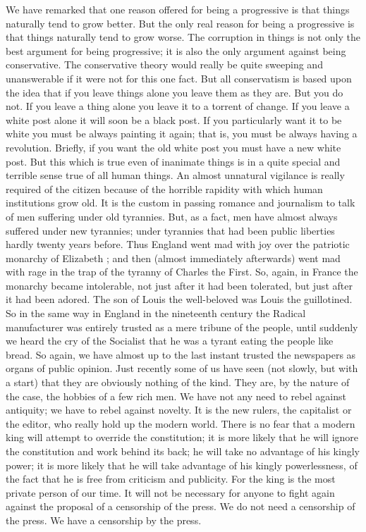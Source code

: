 \documentclass{book}
\begin{document}
We have remarked that one reason offered for being a progressive is that things naturally tend to grow better. But the only real reason for being a progressive is that things naturally tend to grow worse. The corruption in things is not only the best argument for being progressive; it is also the only argument against being conservative. The conservative theory would really be quite sweeping and unanswerable if it were not for this one fact. But all conservatism is based upon the idea that if you leave things alone you leave them as they are. But you do not. If you leave a thing alone you leave it to a torrent of change. If you leave a white post alone it will soon be a black post. If you particularly want it to be white you must be always painting it again; that is, you must be always having a revolution. Briefly, if you want the old white post you must have a new white post. But this which is true even of inanimate things is in a quite special and terrible sense true of all human things. An almost unnatural vigilance is really required of the citizen because of the horrible rapidity with which human institutions grow old. It is the custom in passing romance and journalism to talk of men suffering under old tyrannies. But, as a fact, men have almost always suffered under new tyrannies; under tyrannies that had been public liberties hardly twenty years before. Thus England went mad with joy over the patriotic monarchy of Elizabeth ; and then (almost immediately afterwards) went mad with rage in the trap of the tyranny of Charles the First. So, again, in France the monarchy became intolerable, not just after it had been tolerated, but just after it had been adored. The son of Louis the well-beloved was Louis the guillotined. So in the same way in England in the nineteenth century the Radical manufacturer was entirely trusted as a mere tribune of the people, until suddenly we heard the cry of the Socialist that he was a tyrant eating the people like bread. So again, we have almost up to the last instant trusted the newspapers as organs of public opinion. Just recently some of us have seen (not slowly, but with a start) that they are obviously nothing of the kind. They are, by the nature of the case, the hobbies of a few rich men. We have not any need to rebel against antiquity; we have to rebel against novelty. It is the new rulers, the capitalist or the editor, who really hold up the modern world. There is no fear that a modern king will attempt to override the constitution; it is more likely that he will ignore the constitution and work behind its back; he will take no advantage of his kingly power; it is more likely that he will take advantage of his kingly powerlessness, of the fact that he is free from criticism and publicity. For the king is the most private person of our time. It will not be necessary for anyone to fight again against the proposal of a censorship of the press. We do not need a censorship of the press. We have a censorship by the press.
\end{document}
